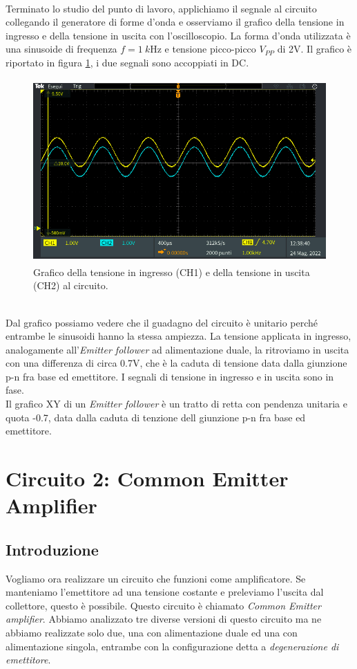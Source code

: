 \documentclass{report}
\begin{document}
\\Terminato lo studio del punto di lavoro, applichiamo il segnale al circuito collegando il generatore di forme d'onda e osserviamo il grafico della tensione in ingresso e della tensione in uscita con l'oscilloscopio. La forma d'onda utilizzata è una sinusoide di frequenza $f=\SI{1}{k\hertz}$ e tensione picco-picco $V_{PP}$ di 2V. Il grafico è riportato in figura \ref{figura:oscillo3}, i due segnali sono accoppiati in DC.
\begin{figure}[h]
\centering
\includegraphics[height=7cm]{immagini/oscillo3}
\caption{Grafico della tensione in ingresso (CH1) e della tensione in uscita (CH2) al circuito.}
\label{figura:oscillo3}
\end{figure}
\\Dal grafico possiamo vedere che il guadagno del circuito è unitario perché entrambe le sinusoidi hanno la stessa ampiezza. La tensione applicata in ingresso, analogamente all'\textit{Emitter follower} ad alimentazione duale, la ritroviamo in uscita con una differenza di circa 0.7V, che è la caduta di tensione data dalla giunzione p-n fra base ed emettitore. I segnali di tensione in ingresso e in uscita sono in fase. 
\\Il grafico XY di un \textit{Emitter follower} è un tratto di retta con pendenza unitaria e quota -0.7, data dalla caduta di tenzione dell giunzione p-n fra base ed emettitore.
\clearpage
\newpage
\chapter{Circuito 2: Common Emitter Amplifier}
\section{Introduzione}
Vogliamo ora realizzare un circuito che funzioni come amplificatore. Se manteniamo l'emettitore ad una tensione costante e preleviamo l'uscita dal collettore, questo è possibile. Questo circuito è chiamato \textit{Common Emitter amplifier}. Abbiamo analizzato tre diverse versioni di questo circuito ma ne abbiamo realizzate solo due, una con alimentazione duale ed una con alimentazione singola, entrambe con la configurazione detta a \textit{degenerazione di emettitore}. 
\end{document}
